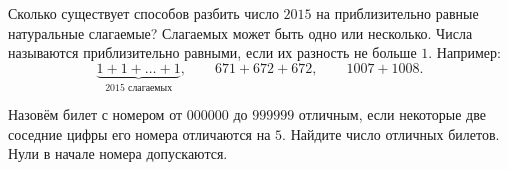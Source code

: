 \begin{problems}
\item Сколько существует способов разбить число $2015$ на приблизительно равные натуральные слагаемые? Слагаемых может быть одно или несколько. Числа называются приблизительно равными, если их разность не больше $1$. Например:
\[
\underbrace{1+1+\ldots+1}_{2015\text{ слагаемых}},
\qquad 671+672+672,
\qquad 1007+1008.
\]

\item Назовём билет с номером от $000000$ до $999999$ отличным, если некоторые две соседние цифры его номера отличаются на $5$. Найдите число отличных билетов. Нули в начале номера допускаются.

\end{problems}

